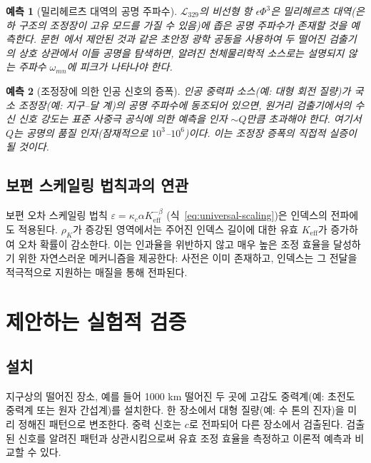 \documentclass[12pt,a4paper]{article}
\newcommand{\Keff}{K_{\mathrm{eff}}}
\newcommand{\kappac}{\kappa_c}
\newcommand{\eps}{\varepsilon}
\newtheorem{prediction}{예측}   %
\begin{document}
	\begin{prediction}[밀리헤르츠 대역의 공명 주파수]
		\(\mathcal{L}_{329}\)의 비선형 항 \(\epsilon \Phi^3\)은 밀리헤르츠 대역(은하 구조의 조정장이 고유 모드를 가질 수 있음)에 좁은 공명 주파수가 존재할 것을 예측한다. 문헌~\cite{Barontini2025}에서 제안된 것과 같은 초안정 광학 공동을 사용하여 두 떨어진 검출기의 상호 상관에서 이들 공명을 탐색하면, 알려진 천체물리학적 소스로는 설명되지 않는 주파수 \(\omega_{mn}\)에 피크가 나타나야 한다.
	\end{prediction}
	
	\begin{prediction}[조정장에 의한 인공 신호의 증폭]
		인공 중력파 소스(예: 대형 회전 질량)가 국소 조정장(예: 지구–달 계)의 공명 주파수에 동조되어 있으면, 원거리 검출기에서의 수신 신호 강도는 표준 사중극 공식에 의한 예측을 인자 \(\sim Q\)만큼 초과해야 한다. 여기서 \(Q\)는 공명의 품질 인자(잠재적으로 \(10^3\)–\(10^6\))이다. 이는 조정장 증폭의 직접적 실증이 될 것이다.
	\end{prediction}
	
	\subsection{보편 스케일링 법칙과의 연관}
	
	보편 오차 스케일링 법칙 \(\eps = \kappac\alpha\Keff^{-\beta}\) (식~\ref{eq:universal-scaling})은 인덱스의 전파에도 적용된다. \(\rho_K\)가 증강된 영역에서는 주어진 인덱스 길이에 대한 유효 \(\Keff\)가 증가하여 오차 확률이 감소한다. 이는 인과율을 위반하지 않고 매우 높은 조정 효율을 달성하기 위한 자연스러운 메커니즘을 제공한다: 사전은 이미 존재하고, 인덱스는 그 전달을 적극적으로 지원하는 매질을 통해 전파된다.
	
	\section{제안하는 실험적 검증}
	\label{sec:experiment}
	
	\subsection{설치}
	
	지구상의 떨어진 장소, 예를 들어 1000 km 떨어진 두 곳에 고감도 중력계(예: 초전도 중력계 또는 원자 간섭계)를 설치한다. 한 장소에서 대형 질량(예: 수 톤의 진자)을 미리 정해진 패턴으로 변조한다. 중력 신호는 \(c\)로 전파되어 다른 장소에서 검출된다. 검출된 신호를 알려진 패턴과 상관시킴으로써 유효 조정 효율을 측정하고 이론적 예측과 비교할 수 있다.
	
\end{document}
